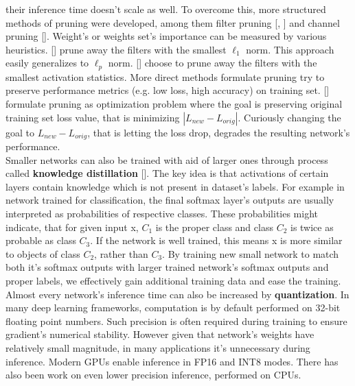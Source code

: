 \documentclass[../Main.tex]{subfiles}
\begin{document}
    their inference time doesn't scale as well. To overcome this, more structured
    methods of pruning were developed, among them filter pruning [\cite{li2016pruning},
    \cite{molchanov2016pruning}]
    and channel pruning [\cite{he2017channel}]. 
    Weight's or weights set's importance can be measured by various heuristics. 
    [\cite{li2016pruning}] prune away the filters with the smallest $\ell_1$ norm.
    This approach easily generalizes to $\ell_p$ norm.
    [\cite{polyak2015}] choose to prune away the filters with
    the smallest activation statistics. More direct methods formulate pruning 
    try to preserve performance metrics (e.g. low loss, high accuracy) on training set. 
    [\cite{molchanov2016pruning}] formulate pruning as optimization problem where
    the goal is preserving original training set loss value, that is minimizing
    $|L_{new} - L_{orig}|$. Curiously changing the goal to $L_{new} - L_{orig}$,
    that is letting the loss drop, degrades the resulting network's performance.\\
    Smaller networks can also be trained with aid of larger ones through process called
    \textbf{knowledge distillation} [\cite{hinton2015distilling}]. 
    The key idea is that activations of certain layers
    contain knowledge which is not present in dataset's labels. For example in network 
    trained for classification, the final softmax layer's outputs are usually 
    interpreted as probabilities of respective classes. These probabilities might indicate,
    that for given input x, $C_1$ is the proper class and class $C_2$ is twice as probable 
    as class $C_3$. If the network is well trained, this means x is more similar to
    objects of class $C_2$, rather than $C_3$. By training new small network to match both
    it's softmax outputs with larger trained network's softmax outputs and proper labels,
    we effectively gain additional training data and ease the training.
    Almost every network's inference time can also be increased by \textbf{quantization}.
    In many deep learning frameworks, computation is by default performed on
    32-bit floating point numbers. Such precision is often required during training to 
    ensure gradient's numerical stability. However given that network's weights have
    relatively small magnitude, in many applications it's unnecessary during inference.
    Modern GPUs enable inference in FP16 and INT8 modes. There has also been work 
    on even lower precision inference, performed on CPUs. 
    
        


\biblio %
\end{document}
